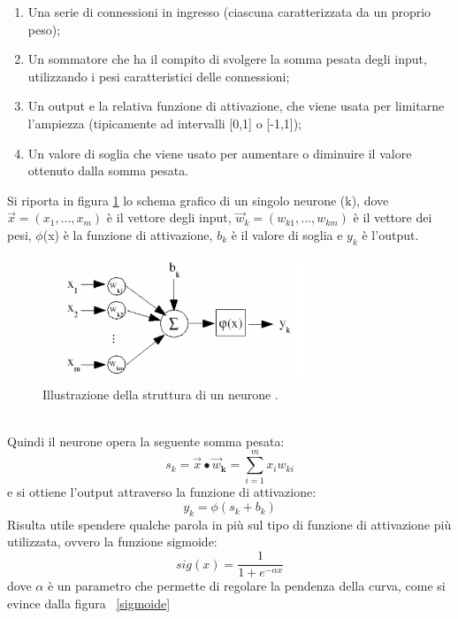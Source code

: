 \begin{enumerate}
	\item Una serie di connessioni in ingresso (ciascuna caratterizzata da un proprio peso);
	\item Un sommatore che ha il compito di svolgere la somma pesata degli input, utilizzando i pesi caratteristici delle connessioni;
	\item Un output e la relativa funzione di attivazione, che viene usata per limitarne l'ampiezza (tipicamente ad intervalli [0,1] o [-1,1]);
	\item Un valore di soglia che viene usato per aumentare o diminuire il valore ottenuto dalla somma pesata.
\end{enumerate}
Si riporta in figura \ref{schema_neurone} lo schema grafico di un singolo neurone (k), dove $\vec{x} = (x_1 ,..., x_m)$ è il vettore degli input, $\vec{w}_k = (w_{k1} ,..., w_{km})$ è il vettore dei pesi, $\phi$(x) è la funzione di attivazione, $b_k$ è il valore di soglia e $y_k$ è l'output.
\begin{figure}[h!]
	\centering
	\includegraphics[width=0.70\textwidth]{figs/schema_neurone.png}
	\caption{Illustrazione della struttura di un neurone \cite{Intro_retiN}.}
	\label{schema_neurone}	
\end{figure} \\
Quindi il neurone opera la seguente somma pesata:
\begin{equation}
s_k = \vec{x}\bullet\vec{w}_\textbf{k} = \sum_{i=1}^{m}x_iw_{ki}
\label{sk}
\end{equation}
e si ottiene l'output attraverso la funzione di attivazione: 
\begin{equation}
y_k = \phi(s_k + b_k)
\end{equation}
Risulta utile spendere qualche parola in più sul tipo di funzione di attivazione più utilizzata, ovvero la funzione sigmoide:
\begin{equation}
sig(x) = \frac{1}{1 + e^{-{\alpha}x}}
\end{equation} 
dove $\alpha$ è un parametro che permette di regolare la pendenza della curva, come si evince dalla figura ~\ref{sigmoide}
